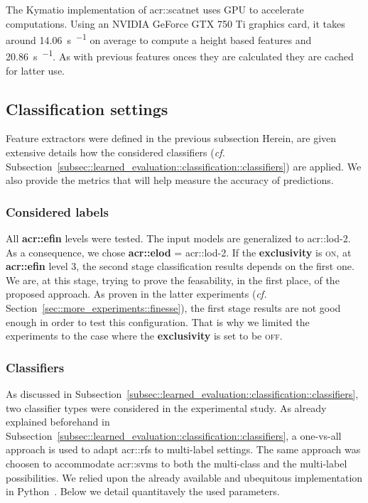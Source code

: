                 The Kymatio implementation of \gls{acr::scatnet} uses GPU to accelerate computations.
                Using an NVIDIA GeForce GTX 750 Ti graphics card, it takes around \SI{14.06}{\s \per \building} on average to compute a height based features and \SI{20.86}{\s \per \building}.
                As with previous features onces they are calculated they are cached for latter use.

    \subsection{Classification settings}
        \label{subsec::experiments::setup::classification}
            Feature extractors were defined in the previous subsection 
            Herein, are given extensive details how the considered classifiers (\textit{cf.} Subsection~\ref{subsec::learned_evaluation::classification::classifiers}) are applied.
            We also provide the metrics that will help measure the accuracy of predictions.

        \subsubsection{Considered labels}
            All \textbf{\gls{acr::efin}} levels were tested.
            The input models are generalized to \gls{acr::lod}-2.
            As a consequence, we chose \textbf{\gls{acr::elod}} = \gls{acr::lod}-2.
            If the \textbf{exclusivity} is \textsc{on}, at \textbf{\gls{acr::efin}} level 3, the second stage classification results depends on the first one.
            We are, at this stage, trying to prove the feasability, in the first place, of the proposed approach.
            As proven in the latter experiments (\textit{cf.} Section~\ref{sec::more_experiments::finesse}), the first stage results are not good enough in order to test this configuration.
            That is why we limited the experiments to the case where the \textbf{exclusivity} is set to be \textsc{off}.

        \subsubsection{Classifiers}
            As discussed in Subsection~\ref{subsec::learned_evaluation::classification::classifiers}, two classifier types were considered in the experimental study.
            As already explained beforehand in Subsection~\ref{subsec::learned_evaluation::classification::classifiers}, a one-vs-all approach is used to adapt \glspl{acr::rf} to multi-label settings.
            The same approach was choosen to accommodate \glspl{acr::svm} to both the multi-class and the multi-label possibilities.
            We relied upon the already available and ubequitous implementation in Python~\parencite{scikit-learn}.
            Below we detail quantitavely the used parameters.
            
